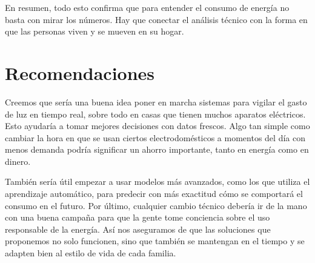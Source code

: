 \documentclass[12pt]{report}
\begin{document}
En resumen, todo esto confirma que para entender el consumo de energía no basta con mirar los números. Hay que conectar el análisis técnico con la forma en que las personas viven y se mueven en su hogar.
\section*{Recomendaciones}
Creemos que sería una buena idea poner en marcha sistemas para vigilar el gasto de luz en tiempo real, sobre todo en casas que tienen muchos aparatos eléctricos. Esto ayudaría a tomar mejores decisiones con datos frescos. Algo tan simple como cambiar la hora en que se usan ciertos electrodomésticos a momentos del día con menos demanda podría significar un ahorro importante, tanto en energía como en dinero.

También sería útil empezar a usar modelos más avanzados, como los que utiliza el aprendizaje automático, para predecir con más exactitud cómo se comportará el consumo en el futuro. Por último, cualquier cambio técnico debería ir de la mano con una buena campaña para que la gente tome conciencia sobre el uso responsable de la energía. Así nos aseguramos de que las soluciones que proponemos no solo funcionen, sino que también se mantengan en el tiempo y se adapten bien al estilo de vida de cada familia.
\vspace{0.5cm}

\end{document}
